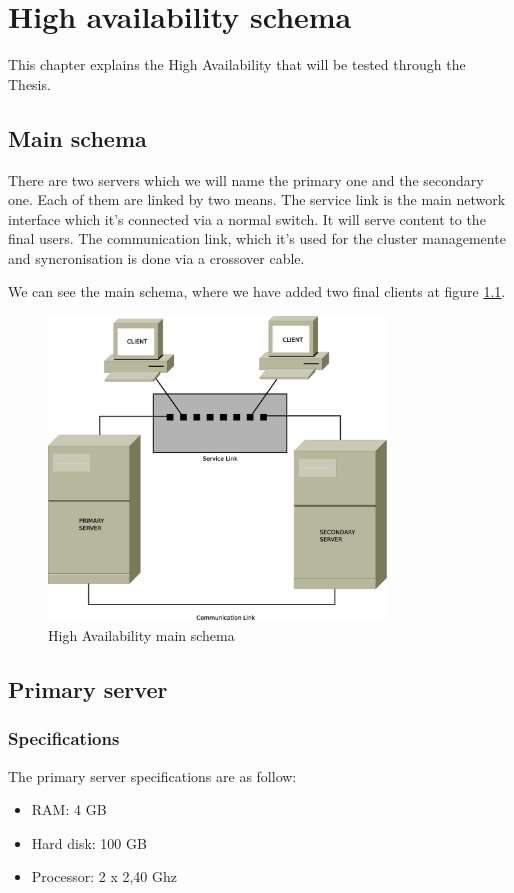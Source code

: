 

\chapter{High availability schema}
This chapter explains the High Availability that will be tested through the Thesis. 

\section {Main schema}
There are two servers which we will name the primary one and the secondary one. Each of them are linked by two means. The service link is the main network interface which it's connected via a normal switch. It will serve content to the final users. The communication link, which it's used for the cluster managemente and syncronisation is done via a crossover cable.

We can see the main schema, where we have added two final clients at figure \ref{fig:main-schema}.

\begin{figure}
  \centering
    \includegraphics[width=0.8\textwidth]{img/ha_main_schema.eps}
  \caption{High Availability main schema}
  \label{fig:main-schema}
\end{figure}

\section {Primary server}
\subsection {Specifications}
The primary server specifications are as follow:
\begin{itemize}
  \item RAM: 4 GB
  \item Hard disk: 100 GB
  \item Processor: 2 x 2,40 Ghz
\end{itemize}

